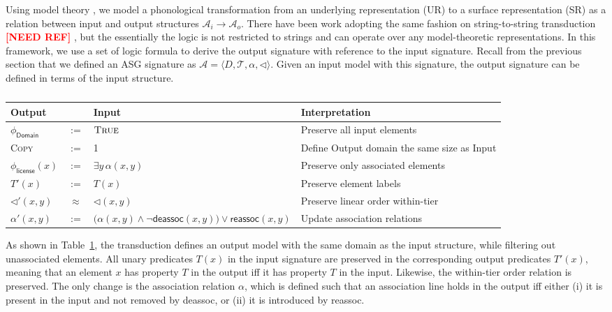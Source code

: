 \documentclass[pmlr]{jmlr}%
\newcommand{\refs}{%
    \textcolor{red}{\textbf{[NEED REF]}}%
    }
\begin{document}
Using model theory \citep{strother2019diss,yolyan2025logical,jardine2017local}, 
we model a phonological transformation from an underlying 
representation (UR) to a surface representation (SR) as a 
relation between input and output structures $\mathcal{A}_i \rightarrow \mathcal{A}_o$. 
There have been work adopting the same fashion on 
string-to-string transduction \refs, but the essentially 
the logic is not restricted to strings and can operate 
over any model-theoretic representations.
In this framework, we use a set of logic formula to derive
the output signature with reference to the input signature. 
Recall from the previous section that we defined an ASG 
signature as $\mathcal{A} = \langle D, \mathcal{T}, \alpha, \lhd \rangle$.
Given an input model with this signature, the output 
signature can be defined in terms of the input structure.
\begin{table}[ht!]
\centering
\footnotesize
\begin{tabular}{lcll}
\toprule
\textbf{Output} & & \textbf{Input} & \textbf{Interpretation} \\
\midrule

$\phi_{\textsf{Domain}}$
&
$:=$
&
$\textsc{True}$
&
Preserve all input elements
\\[0.5em]


\textsc{Copy}
&
$:=$
&
1&
Define Output domain the same size as Input
\\[0.5em]


$\phi_{\textsf{license}}(x)$
&
$:=$
&
$\exists y\, \alpha(x,y)$
&
Preserve only associated elements
\\[0.5em]

$T'(x)$
&
$:=$
&
$T(x)$
&
Preserve element labels
\\[0.5em]

$\lhd'(x,y)$
&
$\approx$
&
$\lhd(x,y)$
&
Preserve linear order within-tier
\\[0.5em]

$\alpha'(x,y)$
&
$:=$
&
$\bigl(
\alpha(x,y)\land
\neg \textsf{deassoc}(x,y)
\bigr)
\lor
\textsf{reassoc}(x,y)$
&
Update association relations
\\

\bottomrule
\end{tabular}

\caption{}
\label{tab.transduction}
\end{table}

As shown in Table~\ref{tab.transduction}, the transduction 
defines an output model with the same domain as the input 
structure, while filtering out unassociated elements. All 
unary predicates \(T(x)\) in the input signature are 
preserved in the corresponding output predicates \(T'(x)\), 
meaning that an element \(x\) has property \(T\) in the 
output iff it has property \(T\) in the input. Likewise, 
the within-tier order relation is preserved. The only 
change is the association relation \(\alpha\), which is defined such 
that an association line holds in the output iff either 
(i) it is present in the input and not removed by \textsf{deassoc}, or 
(ii) it is introduced by \textsf{reassoc}. 
\end{document}
